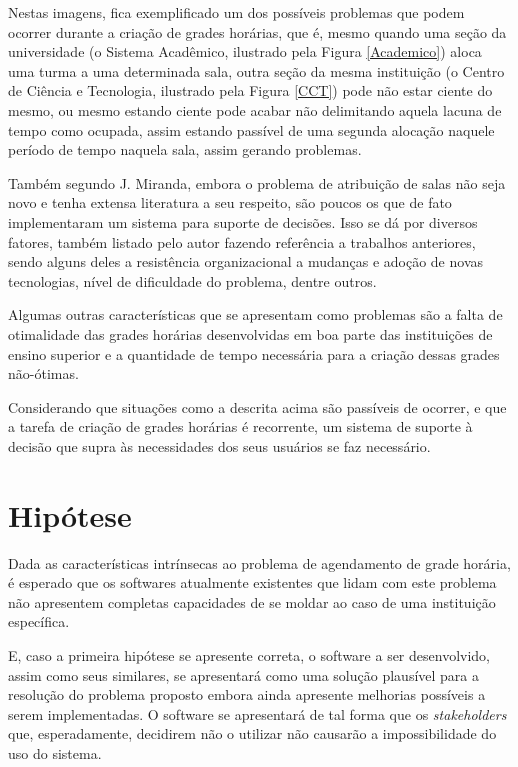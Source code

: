 Nestas imagens, fica exemplificado um dos possíveis problemas que podem ocorrer durante a criação de grades horárias, que é, mesmo quando uma seção da universidade (o Sistema Acadêmico, ilustrado pela Figura \ref{Academico}) aloca uma turma a uma determinada sala, outra seção da mesma instituição (o Centro de Ciência e Tecnologia, ilustrado pela Figura \ref{CCT}) pode não estar ciente do mesmo, ou mesmo estando ciente pode acabar não delimitando aquela lacuna de tempo como ocupada, assim estando passível de uma segunda alocação naquele período de tempo naquela sala, assim gerando problemas.

Também segundo J. Miranda, embora o problema de atribuição de salas não seja novo e tenha extensa literatura a seu respeito, são poucos os que de fato implementaram um sistema para suporte de decisões. Isso se dá por diversos fatores, também listado pelo autor fazendo referência a trabalhos anteriores, sendo alguns deles a resistência organizacional a mudanças e adoção de novas tecnologias, nível de dificuldade do problema, dentre outros.


Algumas outras características que se apresentam como problemas são a falta de otimalidade das grades horárias desenvolvidas em boa parte das instituições de ensino superior e a quantidade de tempo necessária para a criação dessas grades não-ótimas.

Considerando que situações como a descrita acima são passíveis de ocorrer, e que a tarefa de criação de grades horárias é recorrente, um sistema de suporte à decisão que supra às necessidades dos seus usuários se faz necessário.

\section{Hipótese} %

Dada as características intrínsecas ao problema de agendamento de grade horária, é esperado que os softwares atualmente existentes que lidam com este problema não apresentem completas capacidades de se moldar ao caso de uma instituição específica.

E, caso a primeira hipótese se apresente correta, o software a ser desenvolvido, assim como seus similares, se apresentará como uma solução plausível para a resolução do problema proposto embora ainda apresente melhorias possíveis a serem implementadas. O software se apresentará de tal forma que os \textit{stakeholders} que, esperadamente, decidirem não o utilizar não causarão a impossibilidade do uso do sistema.

